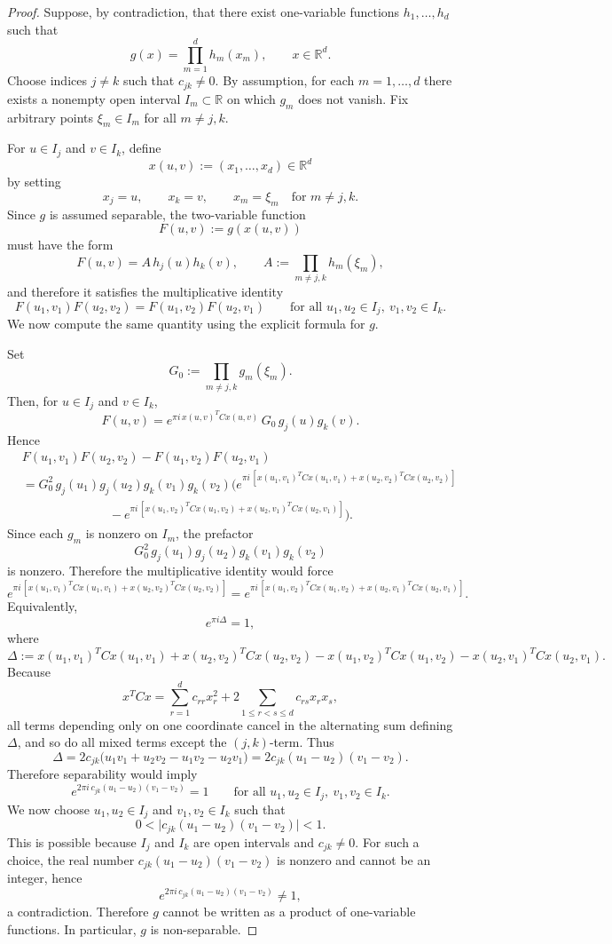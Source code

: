 \documentclass[final,1p,times,authoryear]{elsarticle}
\theoremstyle{definition}
\newcommand{\R}{\mathbb{R}}
\newcommand{\1}{\mathbf{1}}
\begin{document}
\begin{proof}
Suppose, by contradiction, that there exist one-variable functions $h_1,\dots,h_d$ such that
$$
g(x)=\prod_{m=1}^d h_m(x_m), \qquad x\in \R^d.
$$
Choose indices $j\neq k$ such that $c_{jk}\neq 0$.
By assumption, for each $m=1,\dots,d$ there exists a nonempty open interval $I_m\subset \R$ on which $g_m$ does not vanish.
Fix arbitrary points $\xi_m\in I_m$ for all $m\neq j,k$.

For $u\in I_j$ and $v\in I_k$, define
$$
x(u,v):=(x_1,\dots,x_d)\in \R^d
$$
by setting
$$
x_j=u,\qquad x_k=v,\qquad x_m=\xi_m \quad \text{for } m\neq j,k.
$$
Since $g$ is assumed separable, the two-variable function
$$
F(u,v):=g(x(u,v))
$$
must have the form
$$
F(u,v)=A\,h_j(u)h_k(v),
\qquad
A:=\prod_{m\neq j,k} h_m(\xi_m),
$$
and therefore it satisfies the multiplicative identity
$$
F(u_1,v_1)F(u_2,v_2)=F(u_1,v_2)F(u_2,v_1)
\qquad
\text{for all } u_1,u_2\in I_j,\ v_1,v_2\in I_k.
$$
We now compute the same quantity using the explicit formula for $g$.

Set
$$
G_0:=\prod_{m\neq j,k} g_m(\xi_m).
$$
Then, for $u\in I_j$ and $v\in I_k$,
$$
F(u,v)=e^{\pi i\, x(u,v)^T C x(u,v)}\,G_0\,g_j(u)g_k(v).
$$
Hence
\begin{align*}
&F(u_1,v_1)F(u_2,v_2)-F(u_1,v_2)F(u_2,v_1)\\
&=
G_0^2\,g_j(u_1)g_j(u_2)g_k(v_1)g_k(v_2)
\Big(
e^{\pi i\,[x(u_1,v_1)^TCx(u_1,v_1)+x(u_2,v_2)^TCx(u_2,v_2)]}\\
&\hspace{7em}
-
e^{\pi i\,[x(u_1,v_2)^TCx(u_1,v_2)+x(u_2,v_1)^TCx(u_2,v_1)]}
\Big).
\end{align*}
Since each $g_m$ is nonzero on $I_m$, the prefactor
$$
G_0^2\,g_j(u_1)g_j(u_2)g_k(v_1)g_k(v_2)
$$
is nonzero. Therefore the multiplicative identity would force
$$
e^{\pi i\,[x(u_1,v_1)^TCx(u_1,v_1)+x(u_2,v_2)^TCx(u_2,v_2)]}
=
e^{\pi i\,[x(u_1,v_2)^TCx(u_1,v_2)+x(u_2,v_1)^TCx(u_2,v_1)]}.
$$
Equivalently,
$$
e^{\pi i \Delta}=1,
$$
where
$$
\Delta
:=
x(u_1,v_1)^TCx(u_1,v_1)+x(u_2,v_2)^TCx(u_2,v_2)
-x(u_1,v_2)^TCx(u_1,v_2)-x(u_2,v_1)^TCx(u_2,v_1).
$$
Because
$$
x^TCx=\sum_{r=1}^d c_{rr}x_r^2+2\sum_{1\le r<s\le d} c_{rs}x_rx_s,
$$
all terms depending only on one coordinate cancel in the alternating sum defining $\Delta$, and so do all mixed terms except the $(j,k)$-term. Thus
$$
\Delta
=
2c_{jk}\big(u_1v_1+u_2v_2-u_1v_2-u_2v_1\big)
=
2c_{jk}(u_1-u_2)(v_1-v_2).
$$
Therefore separability would imply
$$
e^{2\pi i\,c_{jk}(u_1-u_2)(v_1-v_2)}=1
\qquad
\text{for all } u_1,u_2\in I_j,\ v_1,v_2\in I_k.
$$
We now choose $u_1,u_2\in I_j$ and $v_1,v_2\in I_k$ such that
$$
0<\big|c_{jk}(u_1-u_2)(v_1-v_2)\big|<1.
$$
This is possible because $I_j$ and $I_k$ are open intervals and $c_{jk}\neq 0$.
For such a choice, the real number $c_{jk}(u_1-u_2)(v_1-v_2)$ is nonzero and cannot be an integer, hence
$$
e^{2\pi i\,c_{jk}(u_1-u_2)(v_1-v_2)}\neq 1,
$$
a contradiction. Therefore $g$ cannot be written as a product of one-variable functions. In particular, $g$ is non-separable.
\end{proof}
\end{document}
